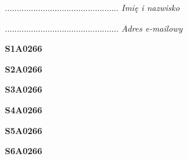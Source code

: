 \begin{turn}{90}\begin{minipage}{\linewidth} \vspace{20mm} ................................................  \textit{Imię i nazwisko}\end{minipage}\end{turn}

\begin{turn}{90}\begin{minipage}{\linewidth} \vspace{20mm} ................................................  \textit{Adres e-mailowy}\end{minipage}\end{turn}

\begin{turn}{90}\huge \begin{minipage}{\linewidth} \vspace{10mm}\textbf{S1A0266}\end{minipage}\end{turn}

\begin{turn}{90}\huge \begin{minipage}{\linewidth} \vspace{10mm}\textbf{S2A0266}\end{minipage}\end{turn}

\begin{turn}{90}\huge \begin{minipage}{\linewidth} \vspace{10mm}\textbf{S3A0266}\end{minipage}\end{turn}

\begin{turn}{90}\huge \begin{minipage}{\linewidth} \vspace{10mm}\textbf{S4A0266}\end{minipage}\end{turn}

\begin{turn}{90}\huge \begin{minipage}{\linewidth} \vspace{10mm}\textbf{S5A0266}\end{minipage}\end{turn}

\begin{turn}{90}\huge \begin{minipage}{\linewidth} \vspace{10mm}\textbf{S6A0266}\end{minipage}\end{turn}

